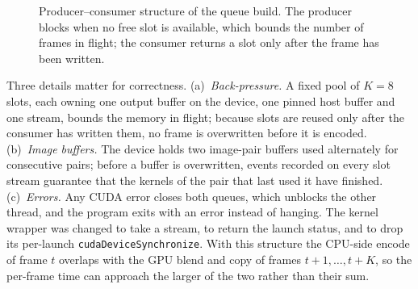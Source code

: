\documentclass[conference]{IEEEtran}
\begin{document}
\begin{figure}[t]
\centering
{}
\caption{Producer--consumer structure of the queue build. The producer blocks when no free slot is available, which bounds the number of frames in flight; the consumer returns a slot only after the frame has been written.}
\label{fig:queue}
\end{figure}

Three details matter for correctness. (a)~\emph{Back-pressure.} A fixed pool of $K{=}8$ slots, each owning one output buffer on the device, one pinned host buffer and one stream, bounds the memory in flight; because slots are reused only after the consumer has written them, no frame is overwritten before it is encoded. (b)~\emph{Image buffers.} The device holds two image-pair buffers used alternately for consecutive pairs; before a buffer is overwritten, events recorded on every slot stream guarantee that the kernels of the pair that last used it have finished. (c)~\emph{Errors.} Any CUDA error closes both queues, which unblocks the other thread, and the program exits with an error instead of hanging. The kernel wrapper was changed to take a stream, to return the launch status, and to drop its per-launch \texttt{cudaDeviceSynchronize}. With this structure the CPU-side encode of frame $t$ overlaps with the GPU blend and copy of frames $t{+}1,\dots,t{+}K$, so the per-frame time can approach the larger of the two rather than their sum.
\end{document}
